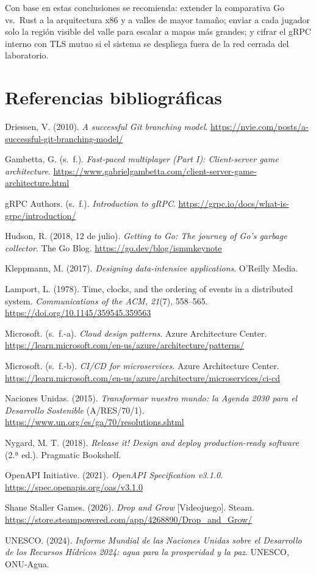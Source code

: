 \documentclass[11pt,letterpaper]{article}
\begin{document}
Con base en estas conclusiones se recomienda: extender la comparativa Go vs.\ Rust a la arquitectura x86 y a valles de mayor tamaño; enviar a cada jugador solo la región visible del valle para escalar a mapas más grandes; y cifrar el gRPC interno con TLS mutuo si el sistema se despliega fuera de la red cerrada del laboratorio.

\section*{Referencias bibliográficas}
\begingroup
\small
\setlength{\parindent}{-1.27cm}\setlength{\leftskip}{1.27cm}\setlength{\parskip}{0.35em}

Driessen, V. (2010). \textit{A successful Git branching model}. \url{https://nvie.com/posts/a-successful-git-branching-model/}

Gambetta, G. (s.~f.). \textit{Fast-paced multiplayer (Part I): Client-server game architecture}. \url{https://www.gabrielgambetta.com/client-server-game-architecture.html}

gRPC Authors. (s.~f.). \textit{Introduction to gRPC}. \url{https://grpc.io/docs/what-is-grpc/introduction/}

Hudson, R. (2018, 12 de julio). \textit{Getting to Go: The journey of Go's garbage collector}. The Go Blog. \url{https://go.dev/blog/ismmkeynote}

Kleppmann, M. (2017). \textit{Designing data-intensive applications}. O'Reilly Media.

Lamport, L. (1978). Time, clocks, and the ordering of events in a distributed system. \textit{Communications of the ACM, 21}(7), 558–565. \url{https://doi.org/10.1145/359545.359563}

Microsoft. (s.~f.-a). \textit{Cloud design patterns}. Azure Architecture Center. \url{https://learn.microsoft.com/en-us/azure/architecture/patterns/}

Microsoft. (s.~f.-b). \textit{CI/CD for microservices}. Azure Architecture Center. \url{https://learn.microsoft.com/en-us/azure/architecture/microservices/ci-cd}

Naciones Unidas. (2015). \textit{Transformar nuestro mundo: la Agenda 2030 para el Desarrollo Sostenible} (A/RES/70/1). \url{https://www.un.org/es/ga/70/resolutions.shtml}

Nygard, M. T. (2018). \textit{Release it! Design and deploy production-ready software} (2.ª ed.). Pragmatic Bookshelf.

OpenAPI Initiative. (2021). \textit{OpenAPI Specification v3.1.0}. \url{https://spec.openapis.org/oas/v3.1.0}

Shane Staller Games. (2026). \textit{Drop and Grow} [Videojuego]. Steam. \url{https://store.steampowered.com/app/4268890/Drop_and_Grow/}

UNESCO. (2024). \textit{Informe Mundial de las Naciones Unidas sobre el Desarrollo de los Recursos Hídricos 2024: agua para la prosperidad y la paz}. UNESCO, ONU-Agua.

\endgroup
\end{document}
